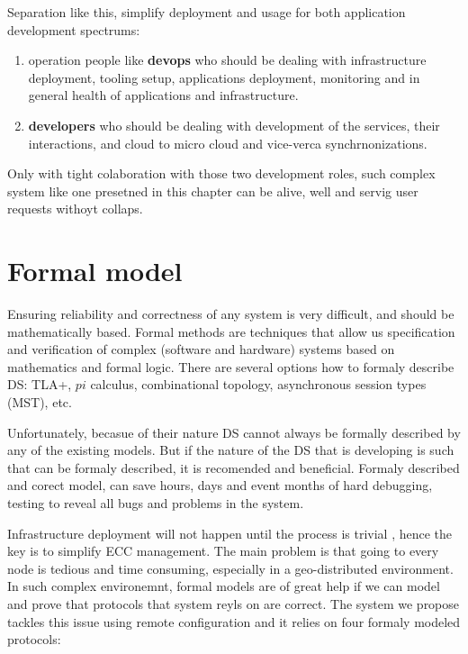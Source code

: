 Separation like this, simplify deployment and usage for both application development spectrums: 

\begin{enumerate}[start=1,label={(\bfseries \roman*)}]
	\item operation people like \textbf{devops} who should be dealing with infrastructure deployment, tooling setup, applications deployment, monitoring and in general health of applications and infrastructure.
	\item \textbf{developers} who should be dealing with development of the services, their interactions, and cloud to micro cloud and vice-verca synchrnonizations.
\end{enumerate}

Only with tight colaboration with those two development roles, such complex system like one presetned in this chapter can be alive, well and servig user requests withoyt collaps.
%
%
\section{Formal model}\label{sec:formal_model}
%
Ensuring reliability and correctness of any system is very difficult, and should be mathematically based. Formal methods are techniques that allow us specification and verification of complex (software and hardware) systems based on mathematics and formal logic. There are several options how to formaly describe DS: TLA+, $pi$ calculus, combinational topology, asynchronous session types (MST), etc. 

Unfortunately, becasue of their nature DS cannot always be formally described by any of the existing models. But if the nature of the DS that is developing is such that can be formaly described, it is recomended and beneficial. Formaly described and corect model, can save hours, days and event months of hard debugging, testing to reveal all bugs and problems in the system.

Infrastructure deployment will not happen until the process is trivial \cite{SatyanarayananBCD09}, hence the key is to simplify ECC management. The main problem is that going to every node is tedious and time consuming, especially in a geo-distributed environment. In such complex environemnt, formal models are of great help if we can model and prove that protocols that system reyls on are correct. The system we propose tackles this issue using remote configuration and it relies on four formaly modeled protocols: 

